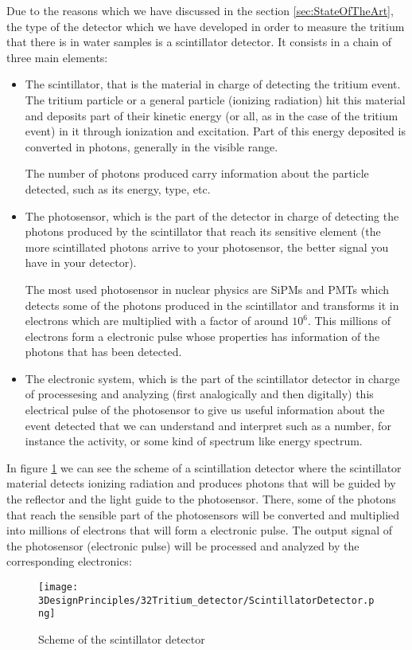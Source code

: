 Due to the reasons which we have discussed in the section \ref{sec:StateOfTheArt}, the type of the detector which we have developed in order to measure the tritium that there is in water samples is a scintillator detector. It consists in a chain of three main elements:

\begin{itemize}

\item{} The scintillator, that is the material in charge of detecting the tritium event. The tritium particle or a general particle (ionizing radiation) hit this material and deposits part of their kinetic energy (or all, as in the case of the tritium event) in it through ionization and excitation. Part of this energy deposited is converted in photons, generally in the visible range.

The number of photons produced carry information about the particle detected, such as its energy, type, etc.

\item{} The photosensor, which is the part of the detector in charge of detecting the photons produced by the scintillator that reach its sensitive element (the more scintillated photons arrive to your photosensor, the better signal you have in your detector). 

The most used photosensor in nuclear physics are SiPMs and PMTs which detects some of the photons produced in the scintillator and transforms it in electrons which are multiplied with a factor of around $10^6$. This millions of electrons form a electronic pulse whose properties has information of the photons that has been detected.

\item{} The electronic system, which is the part of the scintillator detector in charge of processesing and analyzing (first analogically and then digitally) this electrical pulse of the photosensor to give us useful information about the event detected that we can understand and interpret such as a number, for instance the activity, or some kind of spectrum like energy spectrum.

\end{itemize}

In figure \ref{fig:ScintillatorDetector} we can see the scheme of a scintillation detector where the scintillator material detects ionizing radiation and produces photons that will be guided by the reflector and the light guide to the photosensor. There, some of the photons that reach the sensible part of the photosensors will be converted and multiplied into millions of electrons that will form a electronic pulse. The output signal of the photosensor (electronic pulse) will be processed and analyzed by the corresponding electronics:

\begin{figure}[hbtp]
\texttt{[image: 3DesignPrinciples/32Tritium\_detector/ScintillatorDetector.png]}
\centering
\caption{Scheme of the scintillator detector \cite{CentelleadoresEspanyol}\label{fig:ScintillatorDetector}}
\end{figure}
